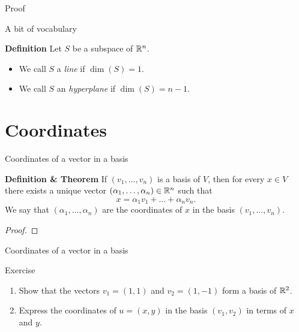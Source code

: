 \documentclass{beamer}
\begin{document}
\begin{frame}[t]{Proof}
	\grid
\end{frame}

\begin{frame}[t]{A bit of vocabulary}
	\grid
	\vspace{-0.4cm}
	\begin{block}{\bf Definition}
		Let $S$ be a subspace of $\mathbb{R}^n$.
		\begin{itemize}
			\item We call $S$ a \emph{line} if $\dim(S) = 1$.
			\item We call $S$ an \emph{hyperplane} if $\dim(S) = n-1$.
		\end{itemize}
	\end{block}
\end{frame}

\section{Coordinates}
\begin{frame}[t]{Coordinates of a vector in a basis}
	\grid
	\vspace{-0.4cm}
	\begin{block}{\bf Definition \& Theorem}
		If $(v_1, \dots, v_n)$ is a basis of $V$, then for every $x \in V$ there exists a unique vector $(\alpha_1, \dots, \alpha_n) \in \mathbb{R}^n$ such that
		$$
		x = \alpha_1 v_1 + \dots + \alpha_n v_n.
		$$
		We say that $(\alpha_1, \dots, \alpha_n)$ are the coordinates of $x$ in the basis $(v_1, \dots, v_n)$.
	\end{block}
	\pause
	\begin{proof}
		\vspace{8.5cm}
		\vfill
	\end{proof}
\end{frame}

\begin{frame}[t]{Coordinates of a vector in a basis}
	\grid
\end{frame}

\begin{frame}[t]{Exercise}
	\grid
	\vspace{-0.8cm}
	\begin{exampleblock}{}
		\begin{enumerate}
			\item Show that the vectors $v_1 = (1,1)$ and $v_2=(1,-1)$ form a basis of $\mathbb{R}^2$.
			\item Express the coordinates of $u=(x,y)$ in the basis $(v_1,v_2)$ in terms of $x$ and $y$.
		\end{enumerate}
	\end{exampleblock}
	\pause
\end{frame}
\end{document}
